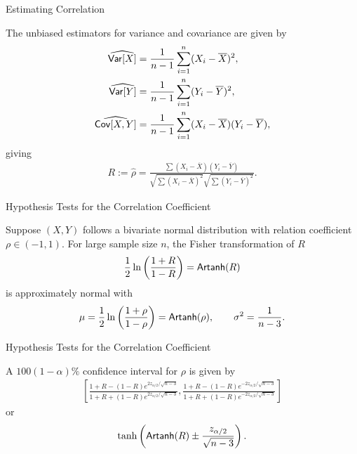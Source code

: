 \begin{frame}{Estimating Correlation}

 The unbiased estimators for variance and covariance are given by
\begin{align*}
\widehat{\mathsf{Var}[X]} & = \frac{1}{n-1}\sum_{i=1}^n(X_i-\overline{X})^2, \\
\widehat{\mathsf{Var}[Y]} & = \frac{1}{n-1}\sum_{i=1}^n(Y_i-\overline{Y})^2, \\
\widehat{\mathsf{Cov}[X, Y]} & = \frac{1}{n-1} \sum_{i=1}^n (X_i-\overline{X})(Y_i-\overline{Y}),
\end{align*}
giving
\begin{align*}
R := \widehat{\rho} = \frac{\sum(X_i-\overline{X})(Y_i-\overline{Y})}{\sqrt{\sum(X_i-\overline{X})^2}\sqrt{\sum(Y_i-\overline{Y})^2}}.
\end{align*}

\end{frame}

\begin{frame}{Hypothesis Tests for the Correlation Coefficient}

\justifying
{} Suppose $(X, Y)$ follows a bivariate normal distribution with relation coefficient $\rho\in (-1, 1)$. For large sample size $n$, the Fisher transformation of $R$
\begin{align*}
\frac{1}{2}\ln\left(\frac{1+R}{1-R} \right) = \mathsf{Artanh}(R) 
\end{align*}
is approximately normal with
\begin{align*}
\mu = \frac{1}{2}\ln\left(\frac{1+\rho}{1-\rho} \right) = \mathsf{Artanh}(\rho), \qquad \sigma^2 = \frac{1}{n-3}.
\end{align*}

\end{frame}

\begin{frame}{Hypothesis Tests for the Correlation Coefficient}

\justifying
{} A $100(1-\alpha)\%$ confidence interval for $\rho$ is given by
\begin{align*}
\left[\frac{1+R-(1-R)e^{2z_{\alpha/2}/\sqrt{n-3}}}{1+R+(1-R)e^{2z_{\alpha/2}/\sqrt{n-3}}},  \frac{1+R-(1-R)e^{-2z_{\alpha/2}/\sqrt{n-3}}}{1+R+(1-R)e^{-2z_{\alpha/2}/\sqrt{n-3}}}\right]
\end{align*}
or
\begin{align*}
\tanh\left(\mathsf{Artanh}(R) \pm \frac{z_{\alpha/2}}{\sqrt{n-3}} \right).
\end{align*}


\end{frame}


